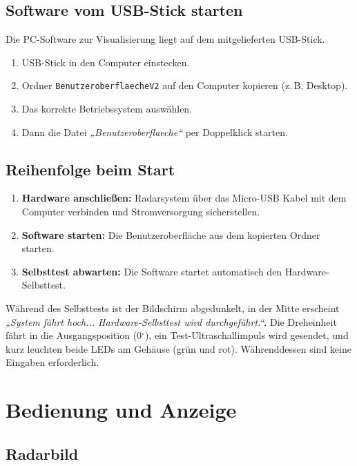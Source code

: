 \documentclass[a4paper,11pt]{article}
\begin{document}
\subsection{Software vom USB-Stick starten}

Die PC-Software zur Visualisierung liegt auf dem mitgelieferten USB-Stick. 

\begin{enumerate}
	\item USB-Stick in den Computer einstecken.
	\item Ordner \texttt{BenutzeroberflaecheV2} auf den Computer kopieren (z.\,B. Desktop).
	\item Das korrekte Betriebssystem auswählen.
	\item Dann die Datei \textit{„Benutzeroberflaeche“} per Doppelklick starten.
\end{enumerate}

\subsection{Reihenfolge beim Start}

\begin{enumerate}
	\item \textbf{Hardware anschließen:} Radarsystem über das Micro-USB Kabel mit dem Computer verbinden und Stromversorgung sicherstellen. 
	\item \textbf{Software starten:} Die Benutzeroberfläche aus dem kopierten Ordner starten. 
	\item \textbf{Selbsttest abwarten:} Die Software startet automatisch den Hardware-Selbsttest.
\end{enumerate}

Während des Selbsttests ist der Bildschirm abgedunkelt, in der Mitte erscheint \textit{„System fährt hoch... Hardware-Selbsttest wird durchgeführt.“}. 
Die Dreheinheit fährt in die Ausgangsposition (0\(^\circ\)), ein Test-Ultraschallimpuls wird gesendet, und kurz leuchten beide LEDs am Gehäuse (grün und rot). 
Währenddessen sind keine Eingaben erforderlich.

\section{Bedienung und Anzeige}

\subsection{Radarbild}
\end{document}

